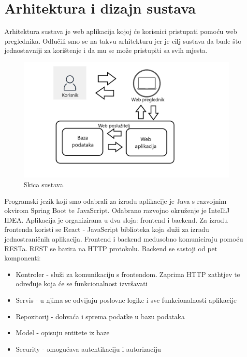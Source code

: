 \chapter{Arhitektura i dizajn sustava}
		
			Arhitektura sustava je web aplikacija kojoj će korisnici pristupati pomoću web preglednika. Odlučili smo se na takvu arhitekturu jer je cilj sustava da bude što jednostavniji za korištenje i da mu se može pristupiti sa svih mjesta.
			
			\begin{figure}[H]
				\includegraphics[scale=0.4]{slike/Skica_sustava.png} %
				\centering
				\caption{Skica sustava}
				\label{fig:sustav}
			\end{figure}
			
			Programski jezik koji smo odabrali za izradu aplikacije je Java s razvojnim okvirom Spring Boot te JavaScript. Odabrano razvojno okruženje je IntelliJ IDEA. 
			Aplikacija je organizirana u dva sloja: frontend i backend. Za izradu frontenda koristi se React - JavaScript biblioteka koja služi za izradu jednostraničnih aplikacija. Frontend i backend međusobno komuniciraju pomoću RESTa. REST se bazira na HTTP protokolu. Backend se sastoji od pet komponenti:
		\begin{itemize}
		\item Kontroler - služi za komunikaciju s frontendom. Zaprima HTTP zathtjev te određuje koja će se funkcionalnost izvršavati
		\item Servis - u njima se odvijaju poslovne logike i sve funkcionalnosti aplikacije
		\item Repozitorij - dohvaća i sprema podatke u bazu podataka
		\item Model - opisuju entitete iz baze 
		\item Security - omogućava autentikaciju i autorizaciju 
	\end{itemize}

